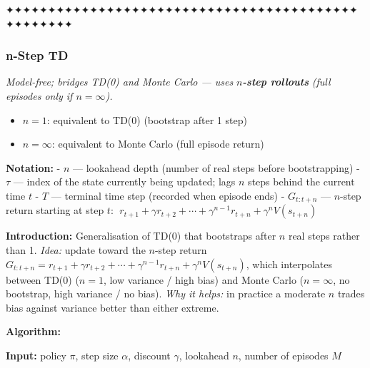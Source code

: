 \documentclass[11pt]{article}
\providecommand{\tightlist}{%
      \setlength{\itemsep}{0pt}\setlength{\parskip}{0pt}}
\begin{document}
    ✦✦✦✦✦✦✦✦✦✦✦✦✦✦✦✦✦✦✦✦✦✦✦✦✦✦✦✦✦✦✦✦✦✦✦✦✦✦✦✦✦✦✦✦✦✦✦✦✦✦

    \clearpage

\label{n-step-td-algo}

    \subsubsection{n-Step TD}\label{n-step-td}

    \emph{Model-free; bridges TD(0) and Monte Carlo --- uses}
\textbf{\emph{\(n\)-step rollouts}} \emph{(full episodes only if
\(n=\infty\)).}

\begin{itemize}
\tightlist
\item
  \(n=1\): equivalent to TD(0) (bootstrap after 1 step)
\item
  \(n=\infty\): equivalent to Monte Carlo (full episode return)
\end{itemize}

    \textbf{Notation:} - \(n\) --- lookahead depth (number of real steps
before bootstrapping) - \(\tau\) --- index of the state currently being
updated; lags \(n\) steps behind the current time \(t\) - \(T\) ---
terminal time step (recorded when episode ends) - \(G_{t:t+n}\) ---
\(n\)-step return starting at step \(t\):
\(\;r_{t+1} + \gamma r_{t+2} + \cdots + \gamma^{n-1}r_{t+n} + \gamma^n V(s_{t+n})\)

    \label{intro-2-3}

    \textbf{Introduction:} Generalisation of TD(0) that bootstraps after
\(n\) real steps rather than 1. \emph{Idea:} update toward the
\(n\)-step return
\(G_{t:t+n} = r_{t+1} + \gamma r_{t+2} + \cdots + \gamma^{n-1}r_{t+n} + \gamma^{n} V(s_{t+n})\),
which interpolates between TD(0) (\(n=1\), low variance / high bias) and
Monte Carlo (\(n=\infty\), no bootstrap, high variance / no bias).
\emph{Why it helps:} in practice a moderate \(n\) trades bias against
variance better than either extreme.

    \textbf{Algorithm:}

\textbf{Input:} policy \(\pi\), step size \(\alpha\), discount
\(\gamma\), lookahead \(n\), number of episodes \(M\)
\end{document}
